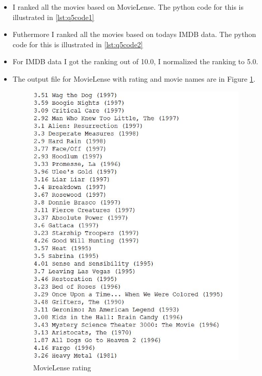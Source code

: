 \begin{itemize}
\item I ranked all the movies based on MovieLense. The python code for this is illustrated in \ref{lst:q5code1}
\item Futhermore I ranked all the movies based on todays IMDB data. The python code for this is illustrated in \ref{lst:q5code2}
\item For IMDB data I got the ranking out of 10.0, I normalized the ranking to 5.0.
\newpage
\item The output file for MovieLense with rating and movie names are in Figure \ref{fig:q5fig1}.
\begin{figure}[h!]
\begin{center}
\hspace*{-3cm} 
\includegraphics[scale=0.55, keepaspectratio=true]{figures/2.JPG}
\caption{MovieLense rating}
\label{fig:q5fig1}
\end{center}
\end{figure}

\end{itemize}
